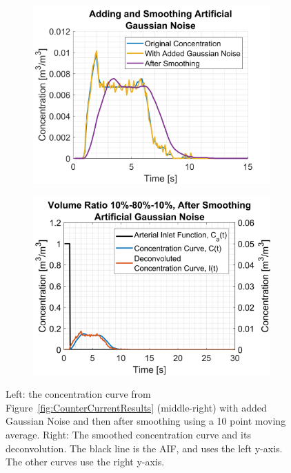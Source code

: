 \documentclass[11pt,english,a4paper,twoside,openright]{report}
\begin{document}
{{{{{{{\begin{figure}[h]
	\centering
	\begin{subfigure}[b]{0.49\textwidth}
		\includegraphics[width=\textwidth]{Chapter4/XRMonteCarlo108010_Gauss1}
	\end{subfigure}
	\begin{subfigure}[b]{0.49\textwidth}
		\includegraphics[width=\textwidth]{Chapter4/XRMonteCarlo108010_Gauss2}
	\end{subfigure}
	\caption[Concentration curve for a single voxel with added Gaussian Noise and deconvolution curve after smoothing using a 10 point moving average]{Left: the concentration curve from Figure~\ref{fig:CounterCurrentResults} (middle-right) with added Gaussian Noise and then after smoothing using a 10 point moving average. Right: The smoothed concentration curve and its deconvolution. The black line is the AIF, and uses the left y-axis. The other curves use the right y-axis.}
	\label{fig:CounterCurrentGauss}
\end{figure}

}}}}}}}
\end{document}

